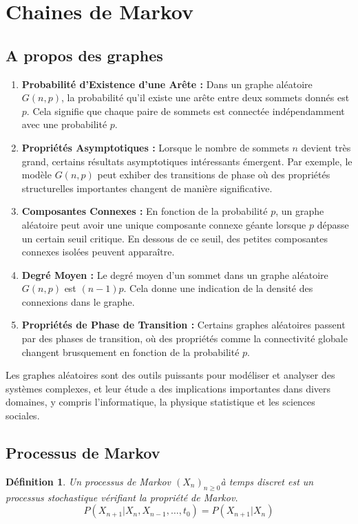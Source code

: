 \documentclass[a4paper]{article}
\newtheorem{definition}{Définition}
\begin{document}
\section{Chaines de Markov}
\subsection{A propos des graphes}

\begin{enumerate}
  \item \textbf{Probabilité d'Existence d'une Arête :} Dans un graphe aléatoire \( G(n, p) \), la probabilité qu'il existe une arête entre deux sommets donnés est \( p \). Cela signifie que chaque paire de sommets est connectée indépendamment avec une probabilité \( p \).

  \item \textbf{Propriétés Asymptotiques :} Lorsque le nombre de sommets \( n \) devient très grand, certains résultats asymptotiques intéressants émergent. Par exemple, le modèle \( G(n, p) \) peut exhiber des transitions de phase où des propriétés structurelles importantes changent de manière significative.

  \item \textbf{Composantes Connexes :} En fonction de la probabilité \( p \), un graphe aléatoire peut avoir une unique composante connexe géante lorsque \( p \) dépasse un certain seuil critique. En dessous de ce seuil, des petites composantes connexes isolées peuvent apparaître.

  \item \textbf{Degré Moyen :} Le degré moyen d'un sommet dans un graphe aléatoire \( G(n, p) \) est \( (n-1)p \). Cela donne une indication de la densité des connexions dans le graphe.

  \item \textbf{Propriétés de Phase de Transition :} Certains graphes aléatoires passent par des phases de transition, où des propriétés comme la connectivité globale changent brusquement en fonction de la probabilité \( p \).

\end{enumerate}

Les graphes aléatoires sont des outils puissants pour modéliser et analyser des systèmes complexes, et leur étude a des implications importantes dans divers domaines, y compris l'informatique, la physique statistique et les sciences sociales.


\subsection{Processus de Markov}
\begin{definition} Un processus de Markov $(X_n)_{n\geq 0}$à temps discret est un processus stochastique vérifiant la propriété de Markov. \\
\begin{equation}
    P(X_{n+1}|X_n,X_{n-1}, \dots, t_0) = P(X_{n+1}|X_n)
\end{equation}
\end{definition}
\end{document}
